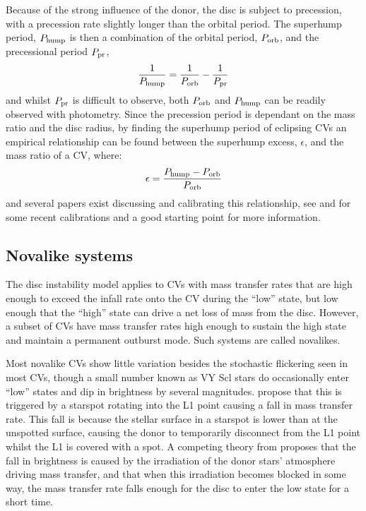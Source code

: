 Because of the strong influence of the donor, the disc is subject to precession, with a precession rate slightly longer than the orbital period. The superhump period, $P_{\rm hump}$ is then a combination of the orbital period, $P_{\rm orb}$, and the precessional period $P_{\rm pr}$,
\begin{equation}
    \frac{1}{P_{\rm hump}} = \frac{1}{P_{\rm orb}} - \frac{1}{P_{\rm pr}}
\end{equation}
and whilst $P_{\rm pr}$ is difficult to observe, both $P_{\rm orb}$ and $P_{\rm hump}$ can be readily observed with photometry. Since the precession period is dependant on the mass ratio and the disc radius, by finding the superhump period of eclipsing CVs an empirical relationship can be found between the superhump excess, $\epsilon$, and the mass ratio of a CV, where:
\begin{equation}
    \epsilon = \frac{P_{\rm hump} - P_{\rm orb}}{P_{\rm orb}}
\end{equation}
and several papers exist discussing and calibrating this relationship, see \citet{McAllister2019} and \citet{kato2022} for some recent calibrations and a good starting point for more information.


\subsection{Novalike systems}

The disc instability model applies to CVs with mass transfer rates that are high enough to exceed the infall rate onto the CV during the ``low'' state, but low enough that the ``high'' state can drive a net loss of mass from the disc. However, a subset of CVs have mass transfer rates high enough to sustain the high state and maintain a permanent outburst mode. Such systems are called novalikes. 

Most novalike CVs show little variation besides the stochastic flickering seen in most CVs, though a small number known as VY Scl stars do occasionally enter ``low'' states and dip in brightness by several magnitudes. \citet{livio1994} propose that this is triggered by a starspot rotating into the L1 point causing a fall in mass transfer rate. This fall is because the stellar surface in a starspot is lower than at the unspotted surface, causing the donor to temporarily disconnect from the L1 point whilst the L1 is covered with a spot.
A competing theory from \citet{wu1995} proposes that the fall in brightness is caused by the irradiation of the donor stars' atmosphere driving mass transfer, and that when this irradiation becomes blocked in some way, the mass transfer rate falls enough for the disc to enter the low state for a short time.


